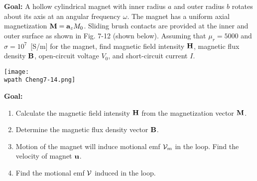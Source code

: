 \documentclass[../../header.tex]{subfiles}
\begin{document}
\textbf{Goal:} A hollow cylindrical magnet with inner radius $a$ and outer radius $b$ rotates about its axis at an angular frequency $\omega$. The magnet has a uniform axial magnetization $\mathbf{M} = \mathbf{a}_z M_0$. Sliding brush contacts are provided at the inner and outer surface as shown in Fig. 7-12 (shown below). Assuming that $\mu_r = 5000$ and $\sigma = 10^7$~[S/m] for  the magnet, find magnetic field intensity $\mathbf{H}$, magnetic flux density $\mathbf{B}$, open-circuit voltage $V_0$, and short-circuit current $I$.
\begin{center}
\texttt{[image: \\wpath Cheng7-14.png]}
\end{center}
\textbf{Goal:} 
\begin{enumerate}
\item Calculate the magnetic field intensity $\mathbf{H}$ from the magnetization vector $\mathbf{M}$.


\item Determine the magnetic flux density vector $\mathbf{B}$.


\item Motion of the magnet will induce motional emf ${\cal V}_m$ in the loop. Find the velocity of magnet $\mathbf{u}$.


\item Find the motional emf ${\cal V}$ induced in the loop.



\end{enumerate}
\end{document}
